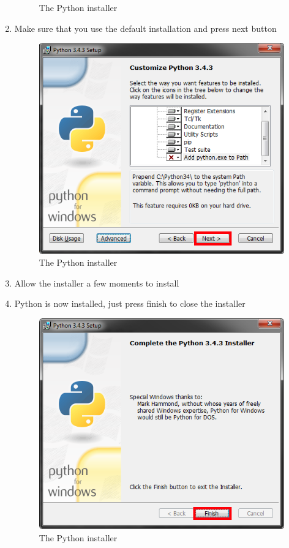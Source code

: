 \begin{enumerate}
\begin{figure}[H]
\caption{The Python installer} \label{fig:PyISP5}
\end{figure}
\item Make sure that you use the default installation and press next button
\begin{figure}[H]
\includegraphics[width=\textwidth]{./Manual/PythonInstall/Part6.png}
\caption{The Python installer} \label{fig:PyISP6}
\end{figure}
\item Allow the installer a few moments to install
\item Python is now installed, just press finish to close the installer
\begin{figure}[H]
\includegraphics[width=\textwidth]{./Manual/PythonInstall/Part7.png}
\caption{The Python installer} \label{fig:PyISP6}
\end{figure}
\end{enumerate}

